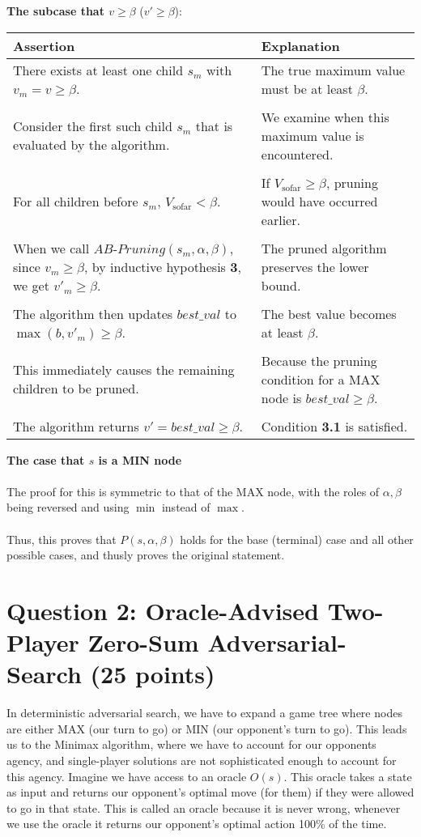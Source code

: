 \documentclass[11pt]{article}
\newcommand{\question}[1]{\section*{\normalsize #1}}
\newenvironment{answercols}
  {\begin{center}\begin{tabular}{p{0.45\textwidth}p{0.45\textwidth}}
   \toprule
   \textbf{Assertion} & \textbf{Explanation} \\
   \midrule}
  {\\ \bottomrule\end{tabular}\end{center}}
\begin{document}
    \textbf {The subcase that $v \ge \beta$} ($v' \ge \beta$):

    \begin{answercols}
        There exists at least one child $s_m$ with $v_m = v \ge \beta$. &
        The true maximum value must be at least $\beta$. \\
        \\
        Consider the first such child $s_m$ that is evaluated by the algorithm. &
        We examine when this maximum value is encountered. \\
        \\
        For all children before $s_m$, $V_{\text{sofar}} < \beta$. &
        If $V_{\text{sofar}} \ge \beta$, pruning would have occurred earlier. \\
        \\
        When we call $AB\text{-}Pruning(s_m, \alpha, \beta)$, since $v_m \ge \beta$, by inductive hypothesis \textbf{3}, we get $v'_m \ge \beta$. &
        The pruned algorithm preserves the lower bound. \\
        \\
        The algorithm then updates $best\_val$ to $\max(b, v'_m) \ge \beta$. &
        The best value becomes at least $\beta$. \\
        \\
        This immediately causes the remaining children to be pruned. &
        Because the pruning condition for a MAX node is $best\_val \ge \beta$. \\
        \\
        The algorithm returns $v' = best\_val \ge \beta$. &
        Condition \textbf{3.1} is satisfied.
    \end{answercols}

    \newpage

    \noindent \textbf{The case that $s$ is a MIN node}
    \\
    \\
    The proof for this is symmetric to that of the MAX node, with the roles of $\alpha, \beta$ being reversed and using $\min$ instead of $\max$.
    \\
    \\
    Thus, this proves that $P(s, \alpha, \beta)$ holds for the base (terminal) case and all other possible cases, and thusly proves the original statement.


    \newpage


    \question{Question 2: Oracle-Advised Two-Player Zero-Sum Adversarial-Search  (25 points)}
    In deterministic adversarial search, we have to expand a game tree where nodes are either MAX (our turn to go) or MIN (our opponent's turn to go). This leads us to the Minimax algorithm, where we have to account for our opponents agency, and single-player solutions are not sophisticated enough to account for this agency. Imagine we have access to an oracle $O(s)$. This oracle takes a state as input and returns our opponent's optimal move (for them) if they were allowed to go in that state. This is called an oracle because it is never wrong, whenever we use the oracle it returns our opponent's optimal action 100\% of the time.\newline
\end{document}
